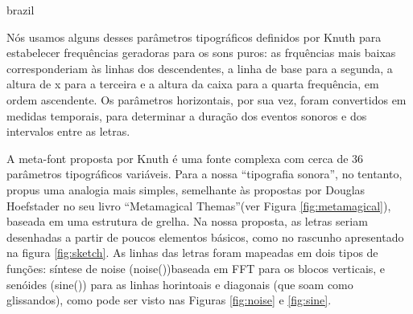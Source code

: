 \begin{otherlanguage*}{brazil}

Nós usamos alguns desses parâmetros tipográficos definidos por Knuth para estabelecer frequências geradoras para os sons puros: as frquências mais baixas corresponderiam às linhas dos descendentes, a linha de base para a segunda, a altura de x para a terceira e a altura da caixa para a quarta frequência, em ordem ascendente. Os parâmetros horizontais, por sua vez, foram convertidos em medidas temporais, para determinar a duração dos eventos sonoros e dos intervalos entre as letras.


A meta-font proposta por Knuth é uma fonte complexa com cerca de 36 parâmetros tipográficos variáveis. Para a nossa ``tipografia sonora'', no tentanto, propus uma analogia mais simples, semelhante às propostas por Douglas Hoefstader no seu livro ``Metamagical Themas''\cite{Metamagical1986}(ver Figura \ref{fig:metamagical}), baseada em uma estrutura de grelha. Na nossa proposta, as letras seriam desenhadas a partir de poucos elementos básicos, como no rascunho apresentado na figura \ref{fig:sketch}. As linhas das letras foram mapeadas em dois tipos de funções: síntese de noise (noise())baseada em FFT para os blocos verticais, e senóides (sine()) para as linhas horintoais e diagonais (que soam como glissandos), como pode ser visto nas Figuras \ref{fig:noise} e \ref{fig:sine}. 





\end{otherlanguage*}
